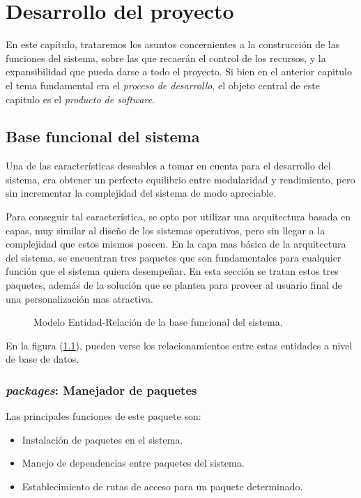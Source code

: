 \chapter{Desarrollo del proyecto}

En este capítulo, trataremos los asuntos concernientes a la construcción de las
funciones del sistema, sobre las que recaerán el control de los recursos, y la
expansibilidad que pueda darse a todo el proyecto. Si bien en el anterior
capitulo el tema fundamental era el \emph{proceso de desarrollo}, el objeto
central de este capitulo es el \emph{producto de software}.

\section{Base funcional del sistema}
Una de las características deseables a tomar en cuenta para el desarrollo del
sistema, era obtener un perfecto equilibrio entre modularidad y rendimiento,
pero sin incrementar la complejidad del sistema de modo apreciable.

Para conseguir tal característica, se opto por utilizar una arquitectura basada
en capas, muy similar al diseño de los sistemas operativos, pero sin llegar a la
complejidad que estos mismos poseen. En la capa mas básica de la arquitectura
del sistema, se encuentran tres paquetes que son fundamentales para cualquier
función que el sistema quiera desempeñar. En esta sección se tratan estos tres
paquetes, además de la solución que se plantea para proveer al usuario final de
una personalización mas atractiva.

\begin{figure}
\centering

\caption{Modelo Entidad-Relación de la base funcional del sistema.}
\label{modelo1}
\end{figure}

En la figura (\ref{modelo1}), pueden verse los relacionamientos entre estas
entidades a nivel de base de datos.

\subsection{\emph{packages}: Manejador de paquetes}
Las principales funciones de este paquete son:

\begin{itemize}
\item Instalación de paquetes en el sistema.
\item Manejo de dependencias entre paquetes del sistema.
\item Establecimiento de rutas de acceso para un paquete determinado.
\end{itemize}

